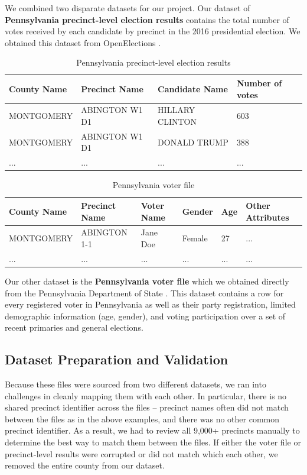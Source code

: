 \documentclass[10pt, letterpaper]{article}
\begin{document}
\begin{multicols}{2}
We combined two disparate datasets for our project. 
Our dataset of \textbf{Pennsylvania precinct-level election results} contains the total number of votes received by each candidate by precinct in the 2016 presidential election. We obtained this dataset from OpenElections \cite{OpenElections}.
\begin{table}
\caption{Pennsylvania precinct-level election results}
\begin{center}
\begin{tabular}{ |l|l|l|l| } 
\hline
County Name & Precinct Name & Candidate Name & Number of votes \\
\hline \hline
MONTGOMERY & ABINGTON W1 D1 & HILLARY CLINTON & 603  \\
\hline
MONTGOMERY & ABINGTON W1 D1 & DONALD TRUMP & 388  \\
\hline
... & ...& ... & ...  \\
\hline
\end{tabular}
\end{center}
\end{table}
\begin{table}
\label{tab:datasets}
\caption{Pennsylvania voter file}
\begin{center}
\begin{tabular}{ |l|l|l|l|l|l| } 
\hline
County Name & Precinct Name & Voter Name & Gender & Age & Other Attributes \\
\hline \hline
MONTGOMERY & ABINGTON 1-1 & Jane Doe & Female & 27 & ... \\
\hline
... & ... & ... & ... & ... & ... \\
\hline
\end{tabular}
\end{center}
\end{table}
Our other dataset is the \textbf{Pennsylvania voter file} which we obtained directly from the Pennsylvania Department of State \cite{PAVoterFile}. This dataset contains a row for every registered voter in Pennsylvania as well as their party registration, limited demographic information (age, gender), and voting participation over a set of recent primaries and general elections.

\subsection{Dataset Preparation and Validation}

Because these files were sourced from two different datasets, we ran into challenges in cleanly mapping them with each other. In particular, there is no shared precinct identifier across the files -- precinct names often did not match between the files as in the above examples, and there was no other common precinct identifier. As a result, we had to review all 9,000+ precincts manually to determine the best way to match them between the files. If either the voter file or precinct-level results were corrupted or did not match which each other, we removed the entire county from our dataset.


\end{multicols}
\end{document}
